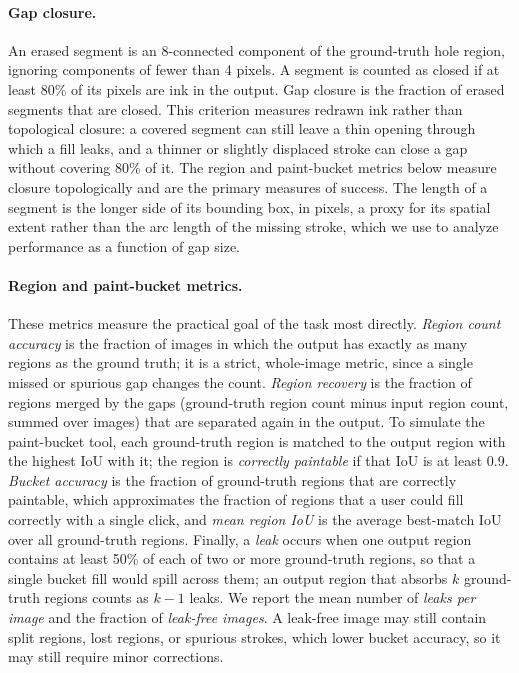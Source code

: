 \documentclass[11pt]{article}
\begin{document}
\paragraph{Gap closure.} An erased segment is an 8-connected component of the
ground-truth hole region, ignoring components of fewer than 4 pixels. A segment is
counted as closed if at least 80\% of its pixels are ink in the output. Gap closure is
the fraction of erased segments that are closed. This criterion measures redrawn
ink rather than topological closure: a covered segment can still leave a thin opening
through which a fill leaks, and a thinner or slightly displaced stroke can close a
gap without covering 80\% of it. The region and paint-bucket metrics below measure
closure topologically and are the primary measures of success. The length of a segment is the
longer side of its bounding box, in pixels, a proxy for its spatial extent rather than
the arc length of the missing stroke, which we use to analyze performance as a
function of gap size.

\paragraph{Region and paint-bucket metrics.} These metrics measure the practical goal
of the task most directly. \emph{Region count accuracy} is the fraction of images in
which the output has exactly as many regions as the ground truth; it is a strict,
whole-image metric, since a single missed or spurious gap changes the count.
\emph{Region recovery} is the fraction of regions merged by the gaps (ground-truth
region count minus input region count, summed over images) that are separated again
in the output. To simulate the paint-bucket tool, each ground-truth region is matched
to the output region with the highest IoU with it; the region is \emph{correctly
paintable} if that IoU is at least 0.9. \emph{Bucket accuracy} is the fraction of
ground-truth regions that are correctly paintable, which approximates the fraction of
regions that a user could fill correctly with a single click, and \emph{mean region
IoU} is the average best-match IoU over all ground-truth regions. Finally, a
\emph{leak} occurs when one output region contains at least 50\% of each of two or
more ground-truth regions, so that a single bucket fill would spill across them; an
output region that absorbs $k$ ground-truth regions counts as $k-1$ leaks. We report
the mean number of \emph{leaks per image} and the fraction of \emph{leak-free images}.
A leak-free image may still contain split regions, lost regions, or spurious strokes,
which lower bucket accuracy, so it may still require minor corrections.
\end{document}
